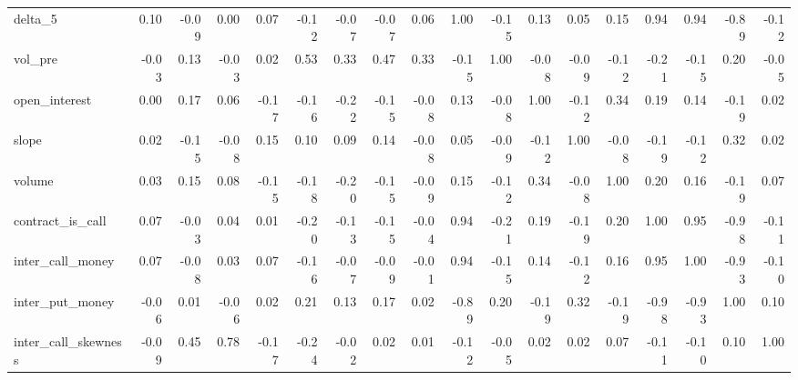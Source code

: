 \begin{tabular}{lrrrrrrrrrrrrrrrrr}
delta\_5             &     0.10 &       -0.09 &      0.00 &      0.07 &   -0.12 &         -0.07 &       -0.07 &  0.06 &     1.00 &    -0.15 &           0.13 &   0.05 &    0.15 &              0.94 &              0.94 &            -0.89 &                -0.12 \\
vol\_pre             &    -0.03 &        0.13 &     -0.03 &      0.02 &    0.53 &          0.33 &        0.47 &  0.33 &    -0.15 &     1.00 &          -0.08 &  -0.09 &   -0.12 &             -0.21 &             -0.15 &             0.20 &                -0.05 \\
open\_interest       &     0.00 &        0.17 &      0.06 &     -0.17 &   -0.16 &         -0.22 &       -0.15 & -0.08 &     0.13 &    -0.08 &           1.00 &  -0.12 &    0.34 &              0.19 &              0.14 &            -0.19 &                 0.02 \\
slope               &     0.02 &       -0.15 &     -0.08 &      0.15 &    0.10 &          0.09 &        0.14 & -0.08 &     0.05 &    -0.09 &          -0.12 &   1.00 &   -0.08 &             -0.19 &             -0.12 &             0.32 &                 0.02 \\
volume              &     0.03 &        0.15 &      0.08 &     -0.15 &   -0.18 &         -0.20 &       -0.15 & -0.09 &     0.15 &    -0.12 &           0.34 &  -0.08 &    1.00 &              0.20 &              0.16 &            -0.19 &                 0.07 \\
contract\_is\_call    &     0.07 &       -0.03 &      0.04 &      0.01 &   -0.20 &         -0.13 &       -0.15 & -0.04 &     0.94 &    -0.21 &           0.19 &  -0.19 &    0.20 &              1.00 &              0.95 &            -0.98 &                -0.11 \\
inter\_call\_money    &     0.07 &       -0.08 &      0.03 &      0.07 &   -0.16 &         -0.07 &       -0.09 & -0.01 &     0.94 &    -0.15 &           0.14 &  -0.12 &    0.16 &              0.95 &              1.00 &            -0.93 &                -0.10 \\
inter\_put\_money     &    -0.06 &        0.01 &     -0.06 &      0.02 &    0.21 &          0.13 &        0.17 &  0.02 &    -0.89 &     0.20 &          -0.19 &   0.32 &   -0.19 &             -0.98 &             -0.93 &             1.00 &                 0.10 \\
inter\_call\_skewness &    -0.09 &        0.45 &      0.78 &     -0.17 &   -0.24 &         -0.02 &        0.02 &  0.01 &    -0.12 &    -0.05 &           0.02 &   0.02 &    0.07 &             -0.11 &             -0.10 &             0.10 &                 1.00 \\
\bottomrule
\end{tabular}
